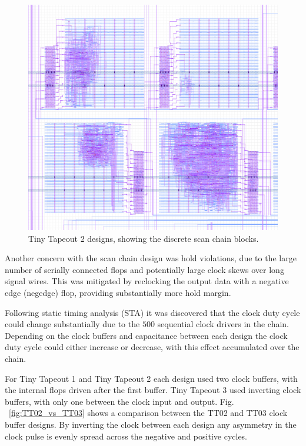 \begin{figure}[!t]
\centering
\includegraphics[width=\columnwidth]{./Figs/tt02_gds_zoom.png}
\caption{Tiny Tapeout 2 designs, showing the discrete scan chain blocks.}
\label{fig:TT02_separate_scan_blocks}
\end{figure}

Another concern with the scan chain design was hold violations, due to the large number of serially connected flops and potentially large clock skews over long signal wires. This was mitigated by reclocking the output data with a negative edge (negedge) flop, providing substantially more hold margin.

Following static timing analysis (STA) it was discovered that the clock duty cycle could change substantially due to the \(500\) sequential clock drivers in the chain. Depending on the clock buffers and capacitance between each design the clock duty cycle could either increase or decrease, with this effect accumulated over the chain.

For Tiny Tapeout 1 and Tiny Tapeout 2 each design used two clock buffers, with the internal flops driven after the first buffer.
Tiny Tapeout 3 used inverting clock buffers, with only one between the clock input and output. Fig. ~\ref{fig:TT02_vs_TT03} shows a comparison between the TT02 and TT03 clock buffer designs. By inverting the clock between each design any asymmetry in the clock pulse is evenly spread across the negative and positive cycles.

